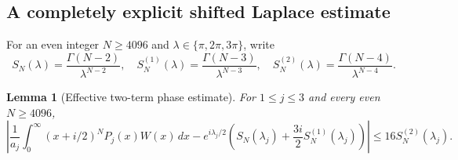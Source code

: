 \documentclass[11pt,a4paper]{article}
\newtheorem{lemma}[theorem]{Lemma}
\theoremstyle{definition}
\theoremstyle{remark}
\numberwithin{equation}{section}
\begin{document}
\subsection{A completely explicit shifted Laplace estimate}

For an even integer $N\ge4096$ and $\lambda\in\{\pi,2\pi,3\pi\}$,
write
\[
 S_N(\lambda)=\frac{\Gamma(N-2)}{\lambda^{N-2}},\quad
 S_N^{(1)}(\lambda)=\frac{\Gamma(N-3)}{\lambda^{N-3}},\quad
 S_N^{(2)}(\lambda)=\frac{\Gamma(N-4)}{\lambda^{N-4}}.
\]

\begin{lemma}[Effective two-term phase estimate]\label{gs:Laplace}
For $1\le j\le3$ and every even $N\ge4096$,
\begin{equation}\label{gs:Laplace-bound}
 \left|\frac1{a_j}\int_0^\infty(x+i/2)^NP_j(x)W(x)\,dx
 -e^{i\lambda_j/2}
     \left(S_N(\lambda_j)+\frac{3i}{2}S_N^{(1)}(\lambda_j)\right)
 \right|\le16S_N^{(2)}(\lambda_j).
\end{equation}
\end{lemma}
\end{document}

